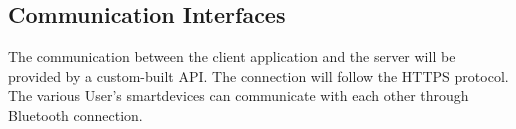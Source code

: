 \subsection{Communication Interfaces}
The communication between the client application and the server will be provided by a custom-built API.
The connection will follow the HTTPS protocol. The various User’s smartdevices can communicate with each other through Bluetooth connection.
